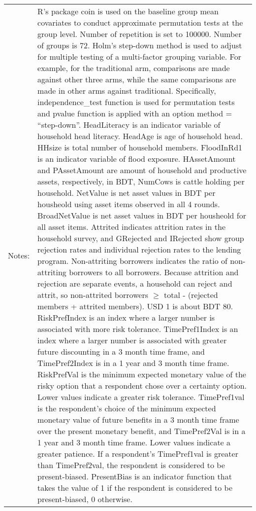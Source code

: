 \begin{minipage}[t]{15cm}
\begin{tabular}{>{\hfill\scriptsize}p{1cm}<{}>{\scriptsize}p{13cm}<{\hfill}}
Notes: & \textsf{R}'s package \textsf{coin} is used on the baseline group mean covariates to conduct approximate permutation tests at the group level. Number of repetition is set to 100000. Number of groups is 72. Holm's step-down method is used to adjust for multiple testing of a multi-factor grouping variable. For example, for the \textsf{traditional} arm, comparisons are made against other three arms, while the same comparisons are made in other arms against \textsf{traditional}. Specifically, \textsf{independence\_test} function is used for permutation tests and \textsf{pvalue} function is applied with an option \textsf{method = ``step-down''}. \textsf{HeadLiteracy} is an indicator variable of household head literacy. \textsf{HeadAge} is age of household head. \textsf{HHsize} is total number of household members. \textsf{FloodInRd1} is an indicator variable of flood exposure. \textsf{HAssetAmount} and \textsf{PAssetAmount} are amount of household and productive assets, respectively, in BDT, \textsf{NumCows} is cattle holding per household. \textsf{NetValue} is net asset values in BDT per housheold using asset items observed in all 4 rounds. \textsf{BroadNetValue} is net asset values in BDT per housheold for all asset items. \textsf{Attrited} indicates attrition rates in the household survey, and \textsf{GRejected} and \textsf{IRejected} show group rejection rates and individual rejection rates to the lending program. \textsf{Non-attriting borrowers} indicates the ratio of non-attriting borrowers to all borrowers. Because attrition and rejection are separate events, a household can reject and attrit, so non-attrited borrowers $\geqslant$ total - (rejected members + attrited members). USD 1 is about BDT 80. \textsf{RiskPrefIndex} is an index where a larger number is associated with more risk tolerance. \textsf{TimePref1Index} is an index where a larger number is associated with greater future discounting in a 3 month time frame, and \textsf{TimePref2Index} is in a 1 year and 3 month time frame. \textsf{RiskPrefVal} is the minimum expected monetary value of the risky option that a respondent chose over a certainty option. Lower values indicate a greater risk tolerance. \textsf{TimePref1val} is the respondent's choice of the minimum expected monetary value of future benefits in a 3 month time frame over the present monetary benefit, and \textsf{TimePref2Val} is in a 1 year and 3 month time frame. Lower values indicate a greater patience. If a respondent's \textsf{TimePref1val} is greater than \textsf{TimePref2val}, the respondent is considered to be present-biased. \textsf{PresentBias} is an indicator function that takes the value of 1 if the respondent is considered to be present-biased, 0 otherwise. \setlength{\baselineskip}{7pt}
\end{tabular}
\end{minipage}

